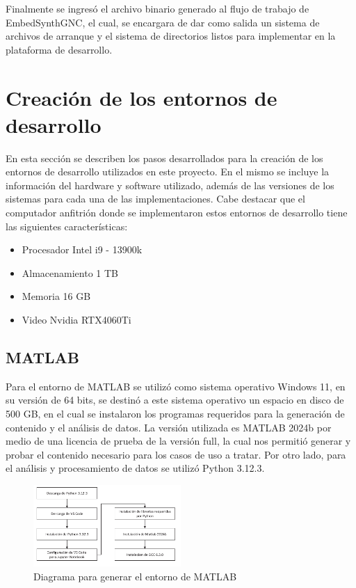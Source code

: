 Finalmente se ingresó el archivo binario generado al flujo de trabajo de EmbedSynthGNC, el cual, se encargara de dar como salida un sistema de archivos de arranque y el sistema de directorios listos para implementar en la plataforma de desarrollo.


\section{Creación de los entornos de desarrollo}

En esta sección se describen los pasos desarrollados para la creación de los entornos de desarrollo utilizados en este proyecto. En el mismo se incluye la información del hardware y software utilizado, además de las versiones de los sistemas para cada una de las implementaciones. Cabe destacar que el computador anfitrión donde se implementaron estos entornos de desarrollo tiene las siguientes características:

\begin{itemize}
    \item Procesador Intel i9 - 13900k 
    \item Almacenamiento 1 TB
    \item Memoria 16 GB
    \item Video Nvidia RTX4060Ti
\end{itemize}

\subsection{MATLAB}\label{subsec:generacion_entorno_matlab}

Para el entorno de MATLAB se utilizó como sistema operativo Windows 11, en su versión de 64 bits, se destinó a este sistema operativo un espacio en disco de 500 GB, en el cual se instalaron los programas requeridos para la generación de contenido y el análisis de datos. La versión utilizada es MATLAB 2024b por medio de una licencia de prueba de la versión full, la cual nos permitió generar y probar el contenido necesario para los casos de uso a tratar. Por otro lado, para el análisis y procesamiento de datos se utilizó Python 3.12.3.

\begin{figure}[h!]
    \centering
    \includegraphics[width=0.5\textwidth]{fig/especifico_2/Entorno_windows}
    \caption{Diagrama para generar el entorno de MATLAB}
    \label{fig:diagrama_entorno_matlab}
\end{figure}

